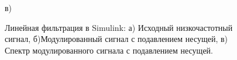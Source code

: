 \documentclass[10pt,a4paper]{article}
\begin{document}
\begin{figure}[H]
\begin{minipage}[h]{0.6\linewidth}
 в) \\
\end{minipage}
\hfill
\caption{Линейная фильтрация в Simulink: а)
Исходный низкочастотный сигнал, б)Модулированный сигнал с подавлением несущей, в) Спектр модулированного сигнала с подавлением несущей.}
\label{ris:experimentalcorrelationsignals}
\end{figure}
\FloatBarrier
\end{document}
